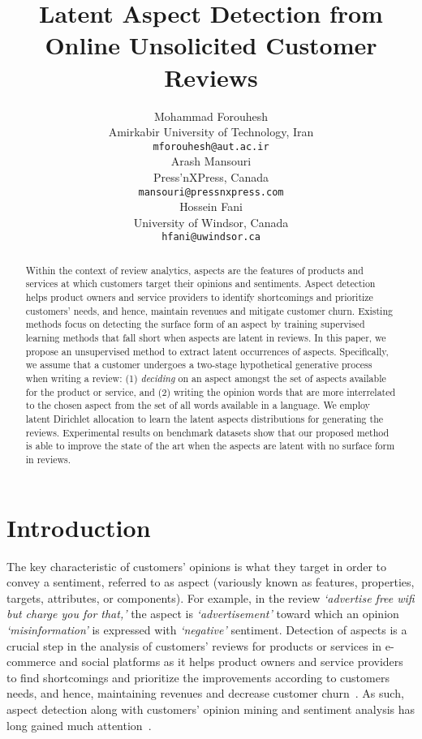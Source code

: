 \documentclass[11pt]{article}
\title{Latent Aspect Detection from Online Unsolicited Customer Reviews}
\author{Mohammad Forouhesh \\
  Amirkabir University of Technology, Iran \\
  \texttt{mforouhesh@aut.ac.ir} \\\And
  Arash Mansouri \\
  Press'nXPress, Canada \\
  \texttt{mansouri@pressnxpress.com} \\\AND
  Hossein Fani \\
  University of Windsor, Canada \\
  \texttt{hfani@uwindsor.ca} \\}
\begin{document}
    \maketitle
\begin{abstract}
Within the context of review analytics, aspects are the features of products and services at which customers target their opinions and sentiments. Aspect detection helps product owners and service providers to identify shortcomings and prioritize customers' needs, and hence, maintain revenues and mitigate customer churn. Existing methods focus on detecting the surface form of an aspect by training supervised learning methods that fall short when aspects are latent in reviews. In this paper, we propose an unsupervised method to extract latent occurrences of aspects. Specifically, we assume that a customer undergoes a two-stage hypothetical generative process when writing a review: (1) \textit{deciding} on an aspect amongst the set of aspects available for the product or service, and (2) writing the opinion words that are more interrelated to the chosen aspect from the set of all words available in a language. We employ latent Dirichlet allocation to learn the latent aspects distributions for generating the reviews. Experimental results on benchmark datasets show that our proposed method is able to improve the state of the art when the aspects are latent with no surface form in reviews. 
\end{abstract}

\section{Introduction}
The key characteristic of customers' opinions is what they target in order to convey a sentiment, referred to as aspect (variously known as features, properties, targets, attributes, or components). For example, in the review \textit{`advertise free wifi but charge you for that,'} the aspect is \textit{`advertisement'} toward which an opinion \textit{`misinformation'} is expressed with \textit{`negative'} sentiment. Detection of aspects is a crucial step in the analysis of customers' reviews for products or services in e-commerce and social platforms as it helps product owners and service providers to find shortcomings and prioritize the improvements according to customers needs, and hence, maintaining revenues and decrease customer churn~\cite{Napitu_2017}. As such, aspect detection along with customers' opinion mining and sentiment analysis has long gained much attention~\cite{Cortis_2021}. 
\end{document}
